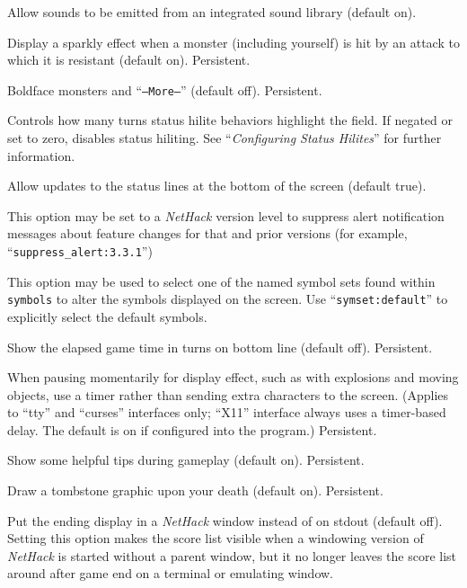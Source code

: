 Allow sounds to be emitted from an integrated sound library (default on).
\item[\ib{sparkle}]
Display a sparkly effect when a monster (including yourself) is hit by an
attack to which it is resistant (default on).  Persistent.
\item[\ib{standout}]
Boldface monsters and ``{\tt --More--}'' (default off).  Persistent.
\item[\ib{statushilites}]
Controls how many turns status hilite behaviors highlight
the field. If negated or set to zero, disables status hiliting.
See ``{\it Configuring Status Hilites\/}'' for further information.
\item[\ib{status\verb+_+updates}]
Allow updates to the status lines at the bottom of the screen (default true).
\item[\ib{suppress\verb+_+alert}]
This option may be set to a {\it NetHack\/} version level to suppress
alert notification messages about feature changes for that
and prior versions (for example, ``{\tt suppress\verb+_+alert:3.3.1}'')
\item[\ib{symset}]
This option may be used to select one of the named symbol sets found within
{\tt symbols} to alter the symbols displayed on the screen.
Use ``{\tt symset:default}'' to explicitly select the default symbols.
\item[\ib{time}]
Show the elapsed game time in turns on bottom line (default off).  Persistent.
\item[\ib{timed\verb+_+delay}]
When pausing momentarily for display effect, such as with explosions and
moving objects, use a timer rather than sending extra characters to the
screen.  (Applies to ``tty'' and ``curses'' interfaces only; ``X11'' interface always
uses a timer-based delay.  The default is on if configured into the
program.)  Persistent.
\item[\ib{tips}]
Show some helpful tips during gameplay (default on).  Persistent.
\item[\ib{tombstone}]
Draw a tombstone graphic upon your death (default on).  Persistent.
\item[\ib{toptenwin}]
Put the ending display in a {\it NetHack\/} window instead of on stdout (default off).
Setting this option makes the score list visible when a windowing version
of {\it NetHack\/} is started without a parent window, but it no longer leaves
the score list around after game end on a terminal or emulating window.
\item[\ib{travel}]

